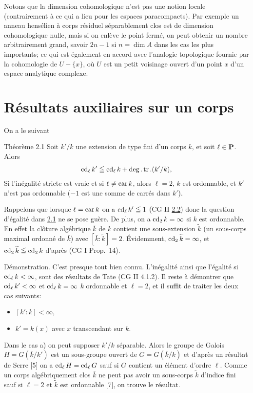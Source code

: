\documentclass[10pt]{../fichiers-configuration-latex/smfart}
\begin{document}
Notons que la dimension cohomologique n'est pas une notion locale
(contrairement à ce qui a lieu pour les espaces paracompacts). Par
exemple un anneau hensélien à corps résiduel séparablement clos est de
dimension cohomologique nulle, mais si on enlève le point fermé, on
peut obtenir un nombre arbitrairement grand, savoir $2n-1$ si $n=\dim
A$ dans les cas les plus importants; ce qui est également en accord
avec l'analogie topologique fournie par la cohomologie de $U-\{x\}$,
où $U$ est un petit voisinage ouvert d'un point $x$ d'un espace
analytique complexe.

\section{Résultats auxiliaires sur un corps}\pageoriginale

On a le suivant

\begin{enonce*}{Théorème 2.1}
Soit $k'/k$ une extension de type fini d'un corps $k$, et soit
$\ell\in \mathbf{P}$. Alors
$$
\operatorname{cd}_{\ell}k'\leqq \operatorname{cd}_{\ell}k+\deg.\operatorname{tr}.(k'/k){},
$$
Si l'inégalité stricte est vraie et si $\ell\neq \operatorname{car} k$, alors
$\ell=2$, $k$ est ordonnable, et $k'$ n'est pas ordonnable (\ie $-1$
est une somme de carrés dans $k'$).
\end{enonce*}

Rappelons que lorsque $\ell=\operatorname{car} k$ on a $\operatorname{cd}_{\ell}k'\leqq 1$ (CG II
\hyperref[X.thm2.2]{2.2}) donc la question d'égalité dans \hyperref[X.thm2.1]{2.1} 
ne se pose guère. De plus, on
a $\operatorname{cd}_2k=\infty$ si $k$ est ordonnable. En effet la clôture
algébrique $\bar{k}$ de $k$ contient une sous-extension
$\widetilde{k}$ (un sous-corps maximal ordonné de $\bar{k}$) avec
$[\bar{k}:\widetilde{k}]=2$. Évidemment, $\operatorname{cd}_2\widetilde{k}=\infty$,
et $\operatorname{cd}_2\widetilde{k}\leqq \operatorname{cd}_2 k$ d'après (CG I Prop.~14).

Démonstration. C'est presque tout bien connu. L'inégalité\sisi{}{,} ainsi que
l'égalité si $\operatorname{cd}_{\ell}k<\infty$, sont des résultats de Tate (CG II
4.1.2). Il reste à démontrer que $\operatorname{cd}_{\ell}k'<\infty$ et
$\operatorname{cd}_{\ell}k=\infty$  $k$ ordonnable et $\ell=2$, et il suffit
de traiter les deux cas suivants:
\begin{itemize}
\item[a)] $[k':k]<\infty$,

\item[b)] $k'=k(x)$ avec $x$ transcendant sur $k$.
\end{itemize}
Dans le cas a) on peut supposer $k'/k$ séparable. Alors le groupe de
Galois $H=G(\bar{k}/k')$ est un sous-groupe ouvert de $G=G(\bar{k}/k)$
et d'après un résultat de Serre [5] on a $\operatorname{cd}_{\ell}H=\operatorname{cd}_{\ell}G$
sauf si $G$ contient un élément d'ordre $\ell$. Comme un corps
algébriquement clos $\bar{k}$ ne peut pas avoir un sous-corps
$\widetilde{k}$ d'indice fini sauf si $\ell=2$ et $\widetilde{k}$ est
ordonnable [7], on trouve le résultat.
\end{document}
